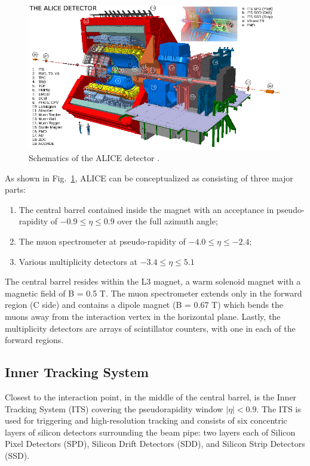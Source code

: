 \begin{figure}[htpb]
  \centering
  \includegraphics[width=0.99\textwidth]{Experimental_Aparatus/ALICE.png}
  \caption{Schematics of the ALICE detector \cite{Tauro2017}.}
  \label{fig:alice}
\end{figure}

As shown in Fig.~\ref{fig:alice}, ALICE can be conceptualized as consisting of three major parts:

\begin{enumerate}
    \item The central barrel contained inside the magnet with an acceptance in pseudo-rapidity of $-0.9 \leq \eta \leq 0.9$ over the full azimuth angle;
    \item The muon spectrometer at pseudo-rapidity of $-4.0 \leq \eta \leq -2.4$; 
    \item Various multiplicity detectors at $-3.4 \leq \eta \leq 5.1$
\end{enumerate}

The central barrel resides within the L3 magnet, a warm solenoid magnet with a magnetic field of B = 0.5 T. The muon spectrometer extends only in the forward region (C side) and contains a dipole magnet (B = 0.67 T) which bends the muons away from the interaction vertex in the horizontal plane. Lastly, the multiplicity detectors are arrays of scintillator counters, with one in each of the forward regions.

\subsection{Inner Tracking System}
\label{sec:ITS}
Closest to the interaction point, in the middle of the central barrel, is the Inner Tracking System (ITS) covering the pseudorapidity window $|\eta| < 0.9$. The ITS is used for triggering and high-resolution tracking and consists of six concentric layers of silicon detectors surrounding the beam pipe: two layers each of Silicon Pixel Detectors (SPD), Silicon Drift Detectors (SDD), and Silicon Strip Detectors (SSD). 

